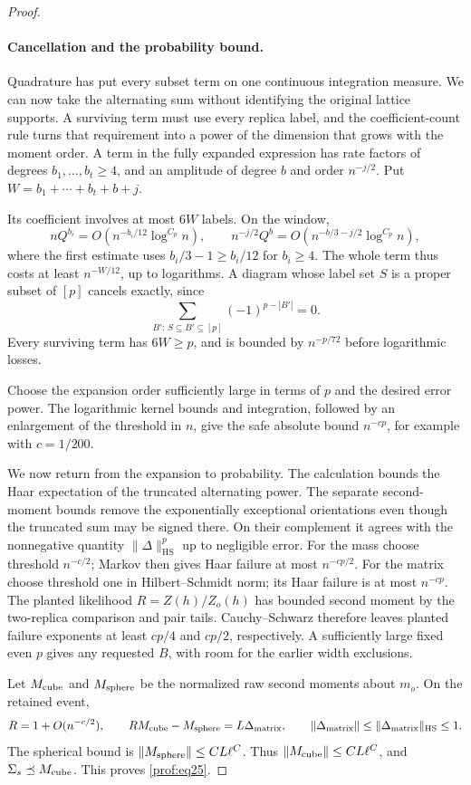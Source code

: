 \begin{proof}
\paragraph{Cancellation and the probability bound.}

Quadrature has put every subset term on one continuous integration
measure. We can now take the alternating sum without identifying the
original lattice supports. A surviving term must use every replica
label, and the coefficient-count rule turns that requirement into a
power of the dimension that grows with the moment order.
A term in the fully expanded expression has rate factors of degrees
\(b_1,\ldots,b_t\ge4\), and an amplitude of degree \(b\) and order
\(n^{-j/2}\).  Put \(W=b_1+\cdots+b_t+b+j\).

Its coefficient involves at most \(6W\) labels.  On the window,
\[
 nQ^{b_i}=O(n^{-b_i/12}\log^{C_p}n),\qquad
 n^{-j/2}Q^b=O(n^{-b/3-j/2}\log^{C_p}n),
\]
where the first estimate uses \(b_i/3-1\ge b_i/12\) for
\(b_i\ge4\).  The whole term thus costs at least
\(n^{-W/12}\), up to logarithms.  A diagram whose label set
\(S\) is a proper subset of \([p]\) cancels exactly, since
\[
 \sum_{B':\,S\subseteq B'\subseteq[p]}(-1)^{p-|B'|}=0.
\]
Every surviving term has \(6W\ge p\), and is bounded by
\(n^{-p/72}\) before logarithmic losses.

Choose the expansion
order sufficiently large in terms of \(p\) and the desired error
power.  The logarithmic kernel bounds and integration, followed by
an enlargement of the threshold in \(n\), give the safe absolute
bound \(n^{-cp}\), for example with \(c=1/200\).

We now return from the expansion to probability. The calculation bounds
the Haar expectation of the truncated alternating power.
The separate second-moment bounds remove the exponentially exceptional
orientations even though the truncated sum may be signed there.  On their complement it agrees with the nonnegative
quantity \(\|\Delta\|_{\mathrm{HS}}^p\) up to negligible error.
For the mass choose threshold \(n^{-c/2}\); Markov then gives Haar
failure at most \(n^{-cp/2}\). For the matrix choose threshold one
in Hilbert--Schmidt norm; its Haar failure is at most \(n^{-cp}\).
The planted likelihood \(R=Z(h)/Z_o(h)\) has bounded second
moment by the two-replica comparison and pair tails.
Cauchy--Schwarz therefore leaves planted failure exponents at
least \(cp/4\) and \(cp/2\), respectively. A sufficiently large
fixed even \(p\) gives any requested \(B\), with room for the
earlier width exclusions.

Let \(M_{\rm cube}\) and \(M_{\rm sphere}\) be the normalized raw
second moments about \(m_o\). On the retained event,
\[
 R=1+O(n^{-c/2}),\qquad
 R M_{\rm cube}-M_{\rm sphere}=L\Delta_{\rm matrix},
 \qquad \|\Delta_{\rm matrix}\|\le
             \|\Delta_{\rm matrix}\|_{\rm HS}\le1.
\]
The spherical bound is
\(\|M_{\rm sphere}\|\le CL\ell^C\). Thus
\(\|M_{\rm cube}\|\le CL\ell^C\), and
\(\Sigma_s\preceq M_{\rm cube}\). This proves \eqref{prof:eq25}.
\end{proof}
